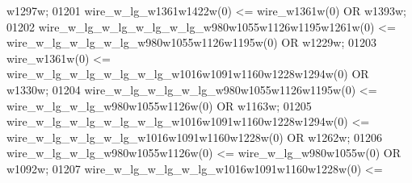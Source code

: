 \begin{DoxyCode}
{{      w1297w};
01201     \textcolor{vhdlchar}{wire_w_lg_w1361w1422w}\textcolor{vhdlchar}{(}\textcolor{vhdllogic}{}\textcolor{vhdllogic}{0}\textcolor{vhdlchar}{)} \textcolor{vhdlchar}{<=} \textcolor{vhdlchar}{wire_w1361w}\textcolor{vhdlchar}{(}\textcolor{vhdllogic}{}\textcolor{vhdllogic}{0}\textcolor{vhdlchar}{)} \textcolor{keywordflow}{OR} \textcolor{vhdlchar}{w1393w};
01202     \textcolor{vhdlchar}{wire_w_lg_w_lg_w_lg_w_lg_w980w1055w1126w1195w1261w}\textcolor{vhdlchar}{(}\textcolor{vhdllogic}{}\textcolor{vhdllogic}{0}\textcolor{vhdlchar}{)} \textcolor{vhdlchar}{<=} \textcolor{vhdlchar}{
      wire_w_lg_w_lg_w_lg_w980w1055w1126w1195w}\textcolor{vhdlchar}{(}\textcolor{vhdllogic}{}\textcolor{vhdllogic}{0}\textcolor{vhdlchar}{)} \textcolor{keywordflow}{OR} \textcolor{vhdlchar}{w1229w};
01203     \textcolor{vhdlchar}{wire_w1361w}\textcolor{vhdlchar}{(}\textcolor{vhdllogic}{}\textcolor{vhdllogic}{0}\textcolor{vhdlchar}{)} \textcolor{vhdlchar}{<=} \textcolor{vhdlchar}{wire_w_lg_w_lg_w_lg_w_lg_w1016w1091w1160w1228w1294w}\textcolor{vhdlchar}{(}\textcolor{vhdllogic}{}\textcolor{vhdllogic}{0}\textcolor{vhdlchar}{)} \textcolor{keywordflow}{OR} \textcolor{vhdlchar}{
      w1330w};
01204     \textcolor{vhdlchar}{wire_w_lg_w_lg_w_lg_w980w1055w1126w1195w}\textcolor{vhdlchar}{(}\textcolor{vhdllogic}{}\textcolor{vhdllogic}{0}\textcolor{vhdlchar}{)} \textcolor{vhdlchar}{<=} \textcolor{vhdlchar}{
      wire_w_lg_w_lg_w980w1055w1126w}\textcolor{vhdlchar}{(}\textcolor{vhdllogic}{}\textcolor{vhdllogic}{0}\textcolor{vhdlchar}{)} \textcolor{keywordflow}{OR} \textcolor{vhdlchar}{w1163w};
01205     \textcolor{vhdlchar}{wire_w_lg_w_lg_w_lg_w_lg_w1016w1091w1160w1228w1294w}\textcolor{vhdlchar}{(}\textcolor{vhdllogic}{}\textcolor{vhdllogic}{0}\textcolor{vhdlchar}{)} \textcolor{vhdlchar}{<=} \textcolor{vhdlchar}{
      wire_w_lg_w_lg_w_lg_w1016w1091w1160w1228w}\textcolor{vhdlchar}{(}\textcolor{vhdllogic}{}\textcolor{vhdllogic}{0}\textcolor{vhdlchar}{)} \textcolor{keywordflow}{OR} \textcolor{vhdlchar}{w1262w};
01206     \textcolor{vhdlchar}{wire_w_lg_w_lg_w980w1055w1126w}\textcolor{vhdlchar}{(}\textcolor{vhdllogic}{}\textcolor{vhdllogic}{0}\textcolor{vhdlchar}{)} \textcolor{vhdlchar}{<=} \textcolor{vhdlchar}{wire_w_lg_w980w1055w}\textcolor{vhdlchar}{(}\textcolor{vhdllogic}{}\textcolor{vhdllogic}{0}\textcolor{vhdlchar}{)} \textcolor{keywordflow}{OR} \textcolor{vhdlchar}{w1092w};
01207     \textcolor{vhdlchar}{wire_w_lg_w_lg_w_lg_w1016w1091w1160w1228w}\textcolor{vhdlchar}{(}\textcolor{vhdllogic}{}\textcolor{vhdllogic}{0}\textcolor{vhdlchar}{)} \textcolor{vhdlchar}{<=} \textcolor{vhdlchar}{
}}
\end{DoxyCode}
